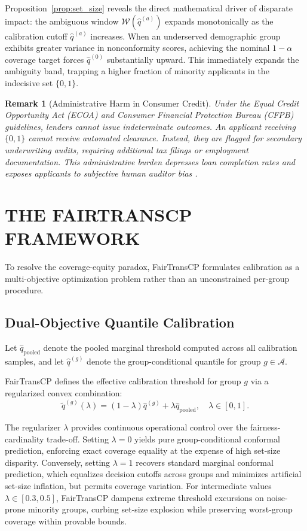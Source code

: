 \documentclass[twoside]{article}
\newtheorem{remark}{Remark}
\begin{document}
Proposition~\ref{prop:set_size} reveals the direct mathematical driver of disparate impact: the ambiguous window $\mathcal{W}(\hat{q}^{(a)})$ expands monotonically as the calibration cutoff $\hat{q}^{(a)}$ increases. When an underserved demographic group exhibits greater variance in nonconformity scores, achieving the nominal $1-\alpha$ coverage target forces $\hat{q}^{(0)}$ substantially upward. This immediately expands the ambiguity band, trapping a higher fraction of minority applicants in the indecisive set $\{0, 1\}$.

\begin{remark}[Administrative Harm in Consumer Credit]
Under the Equal Credit Opportunity Act (ECOA) and Consumer Financial Protection Bureau (CFPB) guidelines, lenders cannot issue indeterminate outcomes. An applicant receiving $\{0, 1\}$ cannot receive automated clearance. Instead, they are flagged for secondary underwriting audits, requiring additional tax filings or employment documentation. This administrative burden depresses loan completion rates and exposes applicants to subjective human auditor bias \citep{charpentier2024insurance}.
\end{remark}

\section{THE FAIRTRANSCP FRAMEWORK}

To resolve the coverage-equity paradox, FairTransCP formulates calibration as a multi-objective optimization problem rather than an unconstrained per-group procedure.

\subsection{Dual-Objective Quantile Calibration}
Let $\hat{q}_{\text{pooled}}$ denote the pooled marginal threshold computed across all calibration samples, and let $\hat{q}^{(g)}$ denote the group-conditional quantile for group $g \in \mathcal{A}$.

FairTransCP defines the effective calibration threshold for group $g$ via a regularized convex combination:
\begin{equation}
\label{eq:interpolation}
\tilde{q}^{(g)}(\lambda) = (1 - \lambda)\hat{q}^{(g)} + \lambda \hat{q}_{\text{pooled}}, \quad \lambda \in [0, 1].
\end{equation}

The regularizer $\lambda$ provides continuous operational control over the fairness-cardinality trade-off. Setting $\lambda = 0$ yields pure group-conditional conformal prediction, enforcing exact coverage equality at the expense of high set-size disparity. Conversely, setting $\lambda = 1$ recovers standard marginal conformal prediction, which equalizes decision cutoffs across groups and minimizes artificial set-size inflation, but permits coverage variation. For intermediate values $\lambda \in [0.3, 0.5]$, FairTransCP dampens extreme threshold excursions on noise-prone minority groups, curbing set-size explosion while preserving worst-group coverage within provable bounds.
\end{document}
